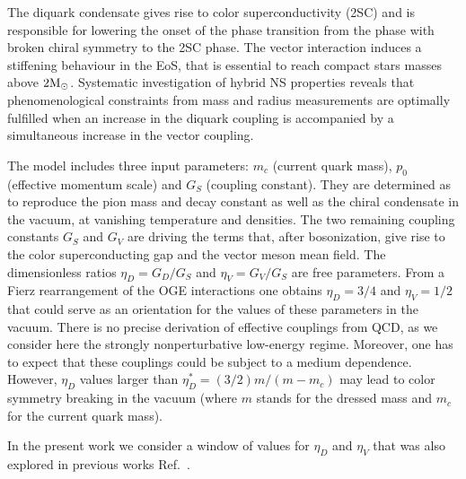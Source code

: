 \documentclass[%
 reprint,
superscriptaddress,
nofootinbib,
 amsmath,amssymb,
 aps,
]{revtex4-1}
\begin{document}
The diquark condensate gives rise to color superconductivity (2SC) and is responsible for lowering the onset of the phase transition from the phase with broken chiral symmetry to the 2SC phase. The vector interaction induces a stiffening behaviour in the EoS, that is essential to reach compact stars masses above $2 \textmd{M}_{\odot}$.
Systematic investigation of hybrid NS properties reveals
\cite{ayriyan2021bayesian,Klahn:2013kga} that phenomenological constraints from mass and radius measurements are optimally fulfilled when an increase in the diquark coupling is accompanied by a simultaneous increase in the vector coupling.  

The model includes three input parameters: $m_c$ (current quark mass), $p_0$ (effective momentum scale) and $G_S$ (coupling constant). They are determined as to reproduce the pion mass and decay constant as well as the chiral condensate in the vacuum, at vanishing temperature and densities. The two remaining coupling constants $G_S$ and $G_V$ are driving the terms that, after bosonization, give rise to the color superconducting gap and the vector meson mean field. 
The dimensionless ratios $\eta_D = G_D/G_S$ and $\eta_V = G_V/G_S$ are free parameters. 
From a Fierz rearrangement of the OGE interactions one obtains $\eta_D =3/4$ and $\eta_V = 1/2$ that could serve as an orientation for the values of these parameters in the vacuum. There is no precise derivation of effective couplings from 
QCD, as we consider here the strongly nonperturbative low-energy regime. Moreover, one has to expect that these couplings could be subject to a medium dependence.  
However, $\eta_D$ values larger than  
$\eta_D^{*} = (3/2)m/(m - m_c)$ 
may lead to color symmetry breaking in the vacuum \cite{Zablocki:2009ds} (where $m$ stands for the dressed mass and $m_c$ for the current quark mass). 

In the present work we consider a window of values for $\eta_D$ and $\eta_V$ that was also explored in previous works Ref.~\cite{Alvarez-Castillo:2018pve,Klahn:2013kga, Ayriyan:2021prr}.
\end{document}
